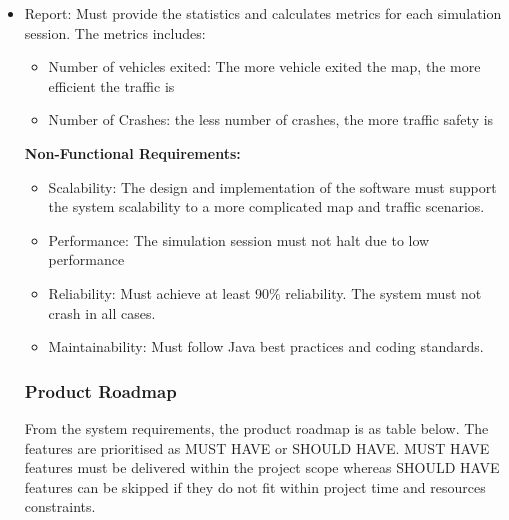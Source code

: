 \documentclass[11pt]{article}
\begin{document}
{\begin{itemize}
\begin{itemize}
\begin{itemize}
        \item Check the traffic context to make decision whether vehicles go straight, turn right, turn left, 3-point turn, increase speed, reduce speed or stop
        \end{itemize}
        
        
       
        \item Report: Must provide the statistics and calculates     metrics  for each simulation session. The metrics includes:
        \begin{itemize}
        \item Number of vehicles exited: The more vehicle exited the map, the more efficient the traffic is 
        \item Number of Crashes: the less number of crashes, the more traffic safety is
        
        \end{itemize}
        

    
    {\bf{Non-Functional Requirements:}} 
    \begin{itemize}
    \item Scalability: The design and implementation of the software must support the system scalability to a more complicated map and traffic scenarios. 
    \item Performance: The simulation session must not halt due to low performance
    \item Reliability: Must achieve at least 90\% reliability. The system must not crash in all cases.
    \item Maintainability: Must follow Java best practices and coding standards. 
    
    \end{itemize}
   
      \subsubsection{Product Roadmap}
  From the system requirements, the product roadmap is as table below. The features are prioritised as MUST HAVE or SHOULD HAVE. MUST HAVE features must be delivered within the project scope whereas SHOULD HAVE features can be skipped if they do not fit within project time and resources  constraints.
  
      \begin{table}[H]
       

\end{table}
\end{itemize}
\end{itemize}}
\end{document}

